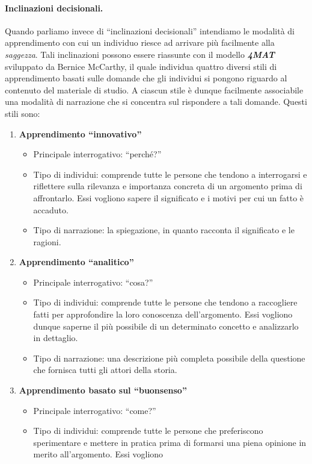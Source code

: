 \paragraph{Inclinazioni decisionali.}
Quando parliamo invece di ``inclinazioni decisionali'' intendiamo le modalità di apprendimento con cui un individuo riesce ad arrivare più facilmente alla \emph{saggezza}. 
Tali inclinazioni possono essere riassunte con il modello \emph{\textbf{4MAT}} sviluppato da Bernice McCarthy, il quale individua quattro diversi stili di apprendimento basati 
sulle domande che gli individui si pongono riguardo al contenuto del materiale di studio. A ciascun stile è dunque facilmente associabile una modalità di narrazione che si concentra
sul rispondere a tali domande.
Questi stili sono:
\begin{enumerate}
    \item \textbf{Apprendimento ``innovativo''}
    \begin{itemize}
        \item Principale interrogativo: ``perché?''
        \item Tipo di individui: comprende tutte le persone che tendono a interrogarsi e riflettere sulla rilevanza e importanza concreta di un argomento prima di affrontarlo.
        Essi vogliono sapere il significato e i motivi per cui un fatto è accaduto.
        \item Tipo di narrazione: la spiegazione, in quanto racconta il significato e le ragioni.
    \end{itemize}
    \item \textbf{Apprendimento ``analitico''}
    \begin{itemize}
        \item Principale interrogativo: ``cosa?''
        \item Tipo di individui: comprende tutte le persone che tendono a raccogliere fatti per approfondire la loro conoscenza dell'argomento. Essi vogliono
        dunque saperne il più possibile di un determinato concetto e analizzarlo in dettaglio.
        \item Tipo di narrazione: una descrizione più completa possibile della questione che fornisca tutti gli attori della storia.
    \end{itemize}
    \item \textbf{Apprendimento basato sul ``buonsenso''}
    \begin{itemize}
        \item Principale interrogativo: ``come?''
        \item Tipo di individui: comprende tutte le persone che preferiscono sperimentare e mettere in pratica prima di formarsi una piena opinione in merito all'argomento. Essi vogliono

\end{itemize}
\end{enumerate}
